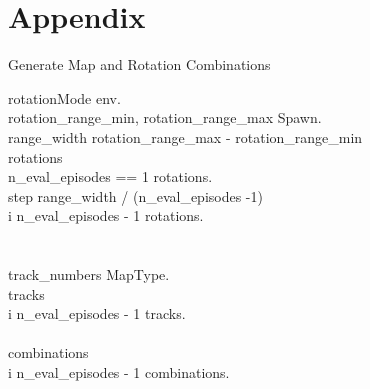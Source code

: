 \chapter{Appendix}
\label{cha:Appendix}



\renewcommand{\thepseudonum}{\roman{pseudonum}}
\begin{pseudocode}{Generate Map and Rotation Combinations}{ }


rotationMode \GETS env.\\
rotation\_range\_min, rotation\_range\_max \GETS Spawn.\\

range\_width \GETS rotation\_range\_max - rotation\_range\_min\\
rotations \GETS []\\

\IF n\_eval\_episodes == 1 \THEN
    rotations.\\
\ELSE
\BEGIN
    step \GETS range\_width / (n\_eval\_episodes -1)\\
    \FOR i  \TO n\_eval\_episodes - 1 \DO
        \BEGIN
        rotations.\\
        \END\\
\END\\

track\_numbers \GETS MapType.\\
tracks \GETS []\\
\FOR i  \TO n\_eval\_episodes - 1 \DO
\BEGIN
tracks.\\
\END\\

combinations \GETS []\\
\FOR i  \TO n\_eval\_episodes - 1 \DO
\BEGIN
combinations.\\
\END\\

\ENDPROCEDURE
\label{fig:generate_track_rotation}
\end{pseudocode}





